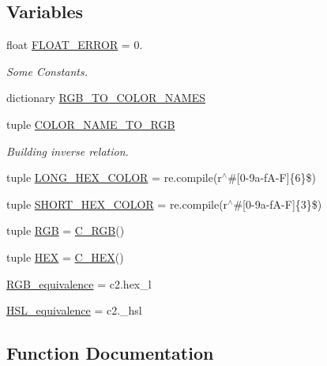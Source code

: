 \subsection*{Variables}
\begin{DoxyCompactItemize}
\item 
float \hyperlink{namespacecolour_af2a4d2191193cc67e779a8f8f7f4eee3}{F\+L\+O\+A\+T\+\_\+\+E\+R\+R\+O\+R} = 0.
\begin{DoxyCompactList}\small\item\em Some Constants. \end{DoxyCompactList}\item 
dictionary \hyperlink{namespacecolour_af7d83e368add5ddec7fda18fc150f958}{R\+G\+B\+\_\+\+T\+O\+\_\+\+C\+O\+L\+O\+R\+\_\+\+N\+A\+M\+E\+S}
\item 
tuple \hyperlink{namespacecolour_a57060f3bcb9159b355ef227f92f930c5}{C\+O\+L\+O\+R\+\_\+\+N\+A\+M\+E\+\_\+\+T\+O\+\_\+\+R\+G\+B}
\begin{DoxyCompactList}\small\item\em Building inverse relation. \end{DoxyCompactList}\item 
tuple \hyperlink{namespacecolour_ae4a86e3c28f0ebb79e51c566a1158fe3}{L\+O\+N\+G\+\_\+\+H\+E\+X\+\_\+\+C\+O\+L\+O\+R} = re.\+compile(r\textquotesingle{}$^\wedge$\#\mbox{[}0-\/9a-\/f\+A-\/\+F\mbox{]}\{6\}\$\textquotesingle{})
\item 
tuple \hyperlink{namespacecolour_a82379003713538cfd6135bb378d1efd8}{S\+H\+O\+R\+T\+\_\+\+H\+E\+X\+\_\+\+C\+O\+L\+O\+R} = re.\+compile(r\textquotesingle{}$^\wedge$\#\mbox{[}0-\/9a-\/f\+A-\/\+F\mbox{]}\{3\}\$\textquotesingle{})
\item 
tuple \hyperlink{namespacecolour_a0e3297b74ebafaa89d8af0d18f547afe}{R\+G\+B} = \hyperlink{classcolour_1_1C__RGB}{C\+\_\+\+R\+G\+B}()
\item 
tuple \hyperlink{namespacecolour_ad515125b83fe560379560056f4d88801}{H\+E\+X} = \hyperlink{classcolour_1_1C__HEX}{C\+\_\+\+H\+E\+X}()
\item 
\hyperlink{namespacecolour_a875f4229391153785064cb3c99096339}{R\+G\+B\+\_\+equivalence} = c2.\+hex\+\_\+l
\item 
\hyperlink{namespacecolour_a05409af0388e5b27e95fee4137e636d5}{H\+S\+L\+\_\+equivalence} = c2.\+\_\+hsl
\end{DoxyCompactItemize}


\subsection{Function Documentation}
\hypertarget{namespacecolour_a2f09d350147b947d6132a6a600a98237}{}
